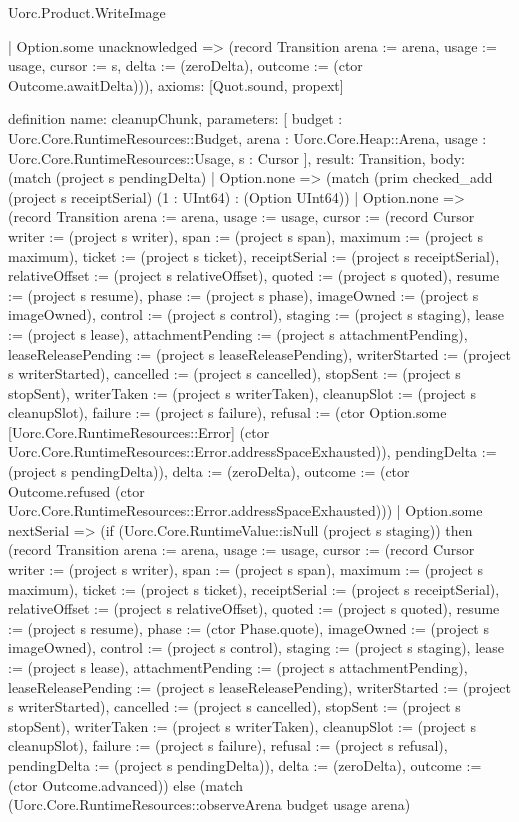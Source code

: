\begin{lexlean}{Uorc.Product.WriteImage}
\begin{semanticmodule}
{    | Option.some unacknowledged => (record Transition {arena := arena, usage := usage, cursor := s, delta := (zeroDelta), outcome := (ctor Outcome.awaitDelta)})),
  axioms: [Quot.sound, propext]
}

definition{
  name: cleanupChunk,
  parameters: [
    budget : Uorc.Core.RuntimeResources::Budget,
    arena : Uorc.Core.Heap::Arena,
    usage : Uorc.Core.RuntimeResources::Usage,
    s : Cursor
  ],
  result: Transition,
  body: (match (project s pendingDelta)
    | Option.none => (match (prim checked_add (project s receiptSerial) (1 : UInt64) : (Option UInt64))
      | Option.none => (record Transition {arena := arena, usage := usage, cursor := (record Cursor {writer := (project s writer), span := (project s span), maximum := (project s maximum), ticket := (project s ticket), receiptSerial := (project s receiptSerial), relativeOffset := (project s relativeOffset), quoted := (project s quoted), resume := (project s resume), phase := (project s phase), imageOwned := (project s imageOwned), control := (project s control), staging := (project s staging), lease := (project s lease), attachmentPending := (project s attachmentPending), leaseReleasePending := (project s leaseReleasePending), writerStarted := (project s writerStarted), cancelled := (project s cancelled), stopSent := (project s stopSent), writerTaken := (project s writerTaken), cleanupSlot := (project s cleanupSlot), failure := (project s failure), refusal := (ctor Option.some [Uorc.Core.RuntimeResources::Error] (ctor Uorc.Core.RuntimeResources::Error.addressSpaceExhausted)), pendingDelta := (project s pendingDelta)}), delta := (zeroDelta), outcome := (ctor Outcome.refused (ctor Uorc.Core.RuntimeResources::Error.addressSpaceExhausted))})
      | Option.some nextSerial => (if (Uorc.Core.RuntimeValue::isNull (project s staging)) then (record Transition {arena := arena, usage := usage, cursor := (record Cursor {writer := (project s writer), span := (project s span), maximum := (project s maximum), ticket := (project s ticket), receiptSerial := (project s receiptSerial), relativeOffset := (project s relativeOffset), quoted := (project s quoted), resume := (project s resume), phase := (ctor Phase.quote), imageOwned := (project s imageOwned), control := (project s control), staging := (project s staging), lease := (project s lease), attachmentPending := (project s attachmentPending), leaseReleasePending := (project s leaseReleasePending), writerStarted := (project s writerStarted), cancelled := (project s cancelled), stopSent := (project s stopSent), writerTaken := (project s writerTaken), cleanupSlot := (project s cleanupSlot), failure := (project s failure), refusal := (project s refusal), pendingDelta := (project s pendingDelta)}), delta := (zeroDelta), outcome := (ctor Outcome.advanced)}) else (match (Uorc.Core.RuntimeResources::observeArena budget usage arena)
}
\end{semanticmodule}
\end{lexlean}
